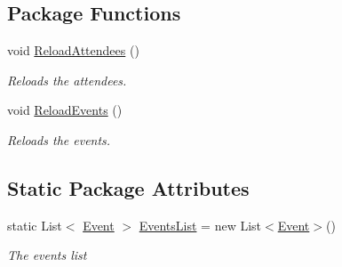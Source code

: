 \subsection*{Package Functions}
\begin{DoxyCompactItemize}
\item 
void \hyperlink{classProject1_1_1MainWindow_af3d1ecd028cb95773e1c1eec3a28e7ce}{Reload\+Attendees} ()
\begin{DoxyCompactList}\small\item\em Reloads the attendees. \end{DoxyCompactList}\item 
void \hyperlink{classProject1_1_1MainWindow_aef6b435caef02f80d3f3752684cf00f6}{Reload\+Events} ()
\begin{DoxyCompactList}\small\item\em Reloads the events. \end{DoxyCompactList}\end{DoxyCompactItemize}
\subsection*{Static Package Attributes}
\begin{DoxyCompactItemize}
\item 
static List$<$ \hyperlink{classProject1_1_1Event}{Event} $>$ \hyperlink{classProject1_1_1MainWindow_ae3afd09951104ecaa17ed586dd934249}{Events\+List} = new List$<$\hyperlink{classProject1_1_1Event}{Event}$>$()
\begin{DoxyCompactList}\small\item\em The events list \end{DoxyCompactList}\end{DoxyCompactItemize}
